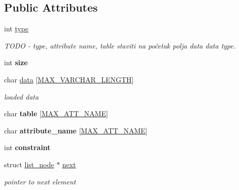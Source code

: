 \subsection*{Public Attributes}
\begin{DoxyCompactItemize}
\item 
\mbox{\label{structlist__node_a236450533668b69e8ec46bb8a4b3997b}} 
int \hyperlink{structlist__node_a236450533668b69e8ec46bb8a4b3997b}{type}
\begin{DoxyCompactList}\small\item\em T\+O\+DO -\/ type, attribute name, table staviti na početak polja data data type. \end{DoxyCompactList}\item 
\mbox{\label{structlist__node_a05b0c2fa493ba99a9b81b4c62d11a9d0}} 
int {\bfseries size}
\item 
\mbox{\label{structlist__node_a438176d721165ccbf8c417377d23addd}} 
char \hyperlink{structlist__node_a438176d721165ccbf8c417377d23addd}{data} \mbox{[}\hyperlink{constants_8h_a9de30df5b4220028fba997e5def2e9d7}{M\+A\+X\+\_\+\+V\+A\+R\+C\+H\+A\+R\+\_\+\+L\+E\+N\+G\+TH}\mbox{]}
\begin{DoxyCompactList}\small\item\em loaded data \end{DoxyCompactList}\item 
\mbox{\label{structlist__node_ac4c46a431f9af274ed149de2add660d8}} 
char {\bfseries table} \mbox{[}\hyperlink{constants_8h_ad221251e45ce1d6bfb3eff3b142c0fcd}{M\+A\+X\+\_\+\+A\+T\+T\+\_\+\+N\+A\+ME}\mbox{]}
\item 
\mbox{\label{structlist__node_a9ab5bf7e7a54cb5dbd8475bcabe5c834}} 
char {\bfseries attribute\+\_\+name} \mbox{[}\hyperlink{constants_8h_ad221251e45ce1d6bfb3eff3b142c0fcd}{M\+A\+X\+\_\+\+A\+T\+T\+\_\+\+N\+A\+ME}\mbox{]}
\item 
\mbox{\label{structlist__node_aafa20af52b63b724dde4a87a17ef2fbe}} 
int {\bfseries constraint}
\item 
\mbox{\label{structlist__node_a0b99ca890dbfe832a8475f4bbd72338c}} 
struct \hyperlink{structlist__node}{list\+\_\+node} $\ast$ \hyperlink{structlist__node_a0b99ca890dbfe832a8475f4bbd72338c}{next}
\begin{DoxyCompactList}\small\item\em pointer to next element \end{DoxyCompactList}\end{DoxyCompactItemize}


